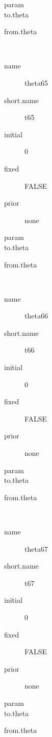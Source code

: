 \begin{description}
\begin{description}
\begin{description}
	 	 	 \item[ param ]  
	 	 	 \item[ to.theta ] \verb|| 
	 	 	 \item[ from.theta ] \verb|| 
	 	 \end{description}
	 	\item[theta65]\ 
	 	 \begin{description}
	 	 	 \item[ name ] theta65 
	 	 	 \item[ short.name ] t65 
	 	 	 \item[ initial ] 0 
	 	 	 \item[ fixed ] FALSE 
	 	 	 \item[ prior ] none 
	 	 	 \item[ param ]  
	 	 	 \item[ to.theta ] \verb|| 
	 	 	 \item[ from.theta ] \verb|| 
	 	 \end{description}
	 	\item[theta66]\ 
	 	 \begin{description}
	 	 	 \item[ name ] theta66 
	 	 	 \item[ short.name ] t66 
	 	 	 \item[ initial ] 0 
	 	 	 \item[ fixed ] FALSE 
	 	 	 \item[ prior ] none 
	 	 	 \item[ param ]  
	 	 	 \item[ to.theta ] \verb|| 
	 	 	 \item[ from.theta ] \verb|| 
	 	 \end{description}
	 	\item[theta67]\ 
	 	 \begin{description}
	 	 	 \item[ name ] theta67 
	 	 	 \item[ short.name ] t67 
	 	 	 \item[ initial ] 0 
	 	 	 \item[ fixed ] FALSE 
	 	 	 \item[ prior ] none 
	 	 	 \item[ param ]  
	 	 	 \item[ to.theta ] \verb|| 
	 	 	 \item[ from.theta ] \verb|| 
	 	 \end{description}
	 	\item[theta68]\ 
	 	 \begin{description}

\end{description}
\end{description}
\end{description}
